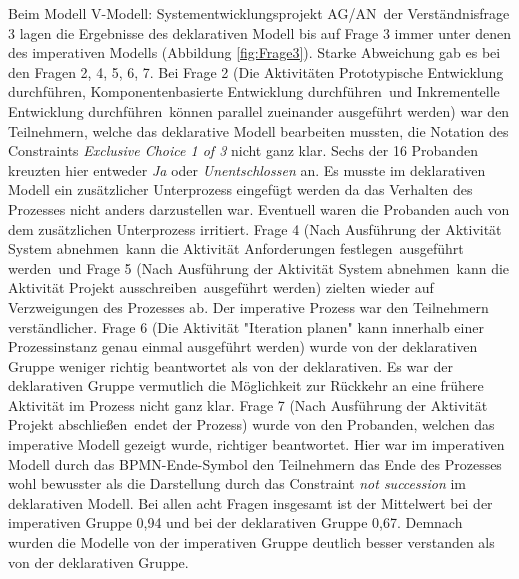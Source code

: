 Beim Modell \grqq V-Modell: Systementwicklungsprojekt AG/AN\grqq \ der Verständnisfrage 3 lagen die Ergebnisse des deklarativen Modell bis auf Frage 3 immer unter denen des imperativen Modells (Abbildung \ref{fig:Frage3}). Starke Abweichung gab es bei den Fragen 2, 4, 5, 6, 7. \newline
Bei Frage 2 (\grqq Die Aktivitäten \grqq Prototypische Entwicklung durchführen\grqq, \grqq Komponentenbasierte Entwicklung durchführen\grqq \ und \grqq Inkrementelle Entwicklung durchführen\grqq \ können parallel zueinander ausgeführt werden\grqq) war den Teilnehmern, welche das deklarative Modell bearbeiten mussten, die Notation des Constraints \textit {Exclusive Choice 1 of 3} nicht ganz klar. Sechs der 16 Probanden kreuzten hier entweder \textit{Ja} oder \textit{Unentschlossen} an. Es musste im deklarativen Modell ein zusätzlicher Unterprozess eingefügt werden da das Verhalten des Prozesses nicht anders darzustellen war. Eventuell waren die Probanden auch von dem zusätzlichen Unterprozess irritiert.\newline
Frage 4 (\grqq Nach Ausführung der Aktivität \grqq System abnehmen\grqq \ kann die Aktivität \grqq Anforderungen festlegen\grqq \ ausgeführt werden\grqq \ und Frage 5 (\grqq Nach Ausführung der Aktivität \grqq System abnehmen\grqq \ kann die Aktivität \grqq Projekt ausschreiben\grqq \ ausgeführt werden\grqq) zielten wieder auf Verzweigungen des Prozesses ab. Der imperative Prozess war den Teilnehmern verständlicher. \newline
Frage 6 (\grqq Die Aktivität "Iteration planen" kann innerhalb einer Prozessinstanz genau einmal ausgeführt werden\grqq) wurde von der deklarativen Gruppe weniger richtig beantwortet als von der deklarativen. Es war der deklarativen Gruppe vermutlich die Möglichkeit zur Rückkehr an eine frühere Aktivität im Prozess nicht ganz klar. \newline
Frage 7 (\grqq Nach Ausführung der Aktivität \grqq Projekt abschließen\grqq \ endet der Prozess\grqq) wurde von den Probanden, welchen das imperative Modell gezeigt wurde, richtiger beantwortet. Hier war im imperativen Modell durch das BPMN-Ende-Symbol den Teilnehmern das Ende des Prozesses wohl bewusster als die Darstellung durch das Constraint \textit{not succession} im deklarativen Modell.\newline
Bei allen acht Fragen insgesamt ist der Mittelwert bei der imperativen Gruppe 0,94 und bei der deklarativen Gruppe 0,67. Demnach wurden die Modelle von der imperativen Gruppe deutlich besser verstanden als von der deklarativen Gruppe. \newline


